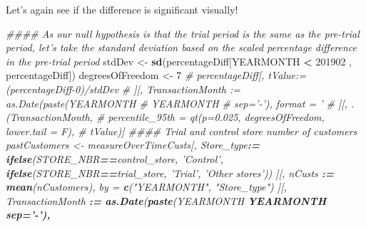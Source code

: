 \documentclass[]{article}
\newenvironment{Shaded}{\begin{snugshade}}{\end{snugshade}}
\newcommand{\CommentTok}[1]{\textcolor[rgb]{0.56,0.35,0.01}{\textit{#1}}}
\newcommand{\DataTypeTok}[1]{\textcolor[rgb]{0.13,0.29,0.53}{#1}}
\newcommand{\DecValTok}[1]{\textcolor[rgb]{0.00,0.00,0.81}{#1}}
\newcommand{\ErrorTok}[1]{\textcolor[rgb]{0.64,0.00,0.00}{\textbf{#1}}}
\newcommand{\KeywordTok}[1]{\textcolor[rgb]{0.13,0.29,0.53}{\textbf{#1}}}
\newcommand{\NormalTok}[1]{#1}
\newcommand{\OperatorTok}[1]{\textcolor[rgb]{0.81,0.36,0.00}{\textbf{#1}}}
\newcommand{\StringTok}[1]{\textcolor[rgb]{0.31,0.60,0.02}{#1}}
\begin{document}
Let's again see if the difference is significant visually!

\begin{Shaded}
\begin{Highlighting}[]
\CommentTok{#### As our null hypothesis is that the trial period is the same as the pre-trial period, let's take the standard deviation based on the scaled percentage difference in the pre-trial period}
\NormalTok{stdDev <-}\StringTok{ }\KeywordTok{sd}\NormalTok{(percentageDiff[YEARMONTH }\OperatorTok{<}\StringTok{ }\DecValTok{201902}\NormalTok{ , percentageDiff])}
\NormalTok{degreesOfFreedom <-}\StringTok{ }\DecValTok{7}
\CommentTok{# percentageDiff[, tValue:= (percentageDiff-0)/stdDev}
\CommentTok{#                ][, TransactionMonth := as.Date(paste(YEARMONTH %
\CommentTok{#                                                      YEARMONTH %
\CommentTok{#                                                      sep='-'), format = '%
\CommentTok{#                  ][, .(TransactionMonth, }
\CommentTok{#                        percentile_95th = qt(p=0.025, degreesOfFreedom, lower.tail = F), }
\CommentTok{#                        tValue)]}
\CommentTok{#### Trial and control store number of customers}
\NormalTok{pastCustomers <-}\StringTok{ }\NormalTok{measureOverTimeCusts[, Store_type}\OperatorTok{:}\ErrorTok{=}\StringTok{ }\KeywordTok{ifelse}\NormalTok{(STORE_NBR}\OperatorTok{==}\NormalTok{control_store, }\StringTok{'Control'}\NormalTok{,}
                                                            \KeywordTok{ifelse}\NormalTok{(STORE_NBR}\OperatorTok{==}\NormalTok{trial_store, }\StringTok{'Trial'}\NormalTok{,}
                                                                   \StringTok{'Other stores'}\NormalTok{))}
\NormalTok{                                      ][, nCusts }\OperatorTok{:}\ErrorTok{=}\StringTok{ }\KeywordTok{mean}\NormalTok{(nCustomers), }
\NormalTok{                                        by =}\StringTok{ }\KeywordTok{c}\NormalTok{(}\StringTok{"YEARMONTH"}\NormalTok{, }\StringTok{"Store_type"}\NormalTok{)}
\NormalTok{                                      ][, TransactionMonth }\OperatorTok{:}\ErrorTok{=}\StringTok{ }\KeywordTok{as.Date}\NormalTok{(}\KeywordTok{paste}\NormalTok{(YEARMONTH }\OperatorTok{%
\NormalTok{                                                                            YEARMONTH }\OperatorTok{%
                                                                            \DataTypeTok{sep=}\StringTok{'-'}\NormalTok{),}
}}}}}
\end{Highlighting}
\end{Shaded}
\end{document}
